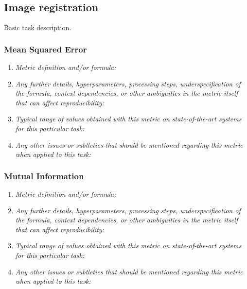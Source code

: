 \documentclass[a4paper,11pt]{article}
\begin{document}
    \subsection{Image registration}
        Basic task description.
        \subsubsection{Mean Squared Error}
            \begin{enumerate}[label=\alph*.]
                \item \textit{Metric definition and/or formula:}
                \bigskip
                \item \textit{Any further details, hyperparameters, processing steps, underspecification of the formula, context dependencies, or other ambiguities in the metric itself that can affect reproducibility:}
                \bigskip
                \item \textit{Typical range of values obtained with this metric on state-of-the-art systems for this particular task:}
                \bigskip
                \item \textit{Any other issues or subtleties that should be mentioned regarding this metric when applied to this task:}
                \bigskip
            \end{enumerate}
        \subsubsection{Mutual Information}
            \begin{enumerate}[label=\alph*.]
                \item \textit{Metric definition and/or formula:}
                \bigskip
                \item \textit{Any further details, hyperparameters, processing steps, underspecification of the formula, context dependencies, or other ambiguities in the metric itself that can affect reproducibility:}
                \bigskip
                \item \textit{Typical range of values obtained with this metric on state-of-the-art systems for this particular task:}
                \bigskip
                \item \textit{Any other issues or subtleties that should be mentioned regarding this metric when applied to this task:}
                \bigskip
            \end{enumerate}
\end{document}
